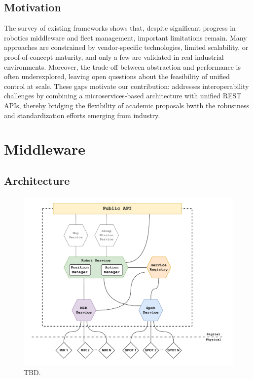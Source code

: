 \documentclass[conference]{IEEEtran}
\begin{document}
\subsection{Motivation}
The survey of existing frameworks shows that, 
 despite significant progress in robotics middleware and fleet management, important limitations remain. 
% 
Many approaches are constrained by vendor-specific technologies, limited scalability, 
 or proof-of-concept maturity, and only a few are validated in real industrial environments. 
% 
Moreover, the trade-off between abstraction and performance is often underexplored, 
 leaving open questions about the feasibility of unified control at scale. 
% 
These gaps motivate our contribution: 
 \approach{} addresses interoperability challenges by combining a microservices-based architecture 
  with unified REST APIs, thereby bridging the flexibility of academic proposals 
   bwith the robustness and standardization efforts emerging from industry.

\section{\approach{} Middleware}\label{sec:arc}
\subsection{Architecture}

\begin{figure}[htb]
    \centering
    \includegraphics[width=1\columnwidth]{images/arc.pdf}
    \caption{
        TBD.
    }
    \label{fig:arc}
\end{figure}
\end{document}
